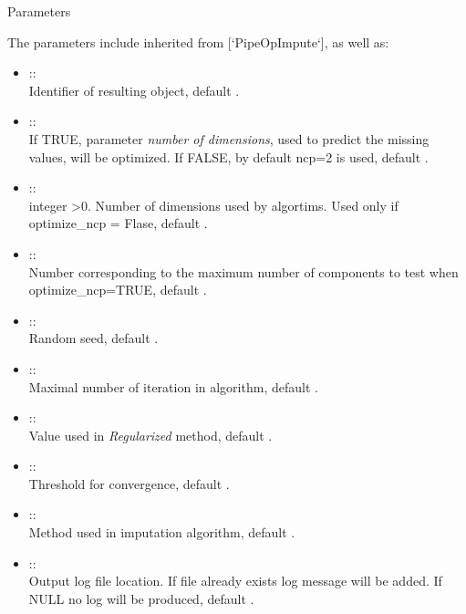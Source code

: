 \documentclass[letterpaper]{book}
\begin{document}
\begin{Section}{Parameters}

The parameters include inherited from [`PipeOpImpute`], as well as: \\{}
\begin{itemize}

\item{}  :: \\{}
Identifier of resulting object, default .
\item{}  :: \\{}
If TRUE, parameter \emph{number of dimensions}, used to predict the missing values, will be optimized. If FALSE, by default ncp=2 is used, default .
\item{}  :: \\{}
integer >0. Number of dimensions used by algortims. Used only if optimize\_ncp = Flase, default .
\item{}  :: \\{}
Number corresponding to the maximum number of components to test when optimize\_ncp=TRUE, default .
\item{}  :: \\{}
Random seed, default .
\item{}  :: \\{}
Maximal number of iteration in algorithm, default .
\item{}  :: \\{}
Value used in \emph{Regularized} method, default .
\item{}  :: \\{}
Threshold for convergence, default .
\item{}  :: \\{}
Method used in imputation algorithm, default .
\item{}  :: \\{}
Output log file location. If file already exists log message will be added. If NULL no log will be produced, default .

\end{itemize}

\end{Section}
\end{document}
